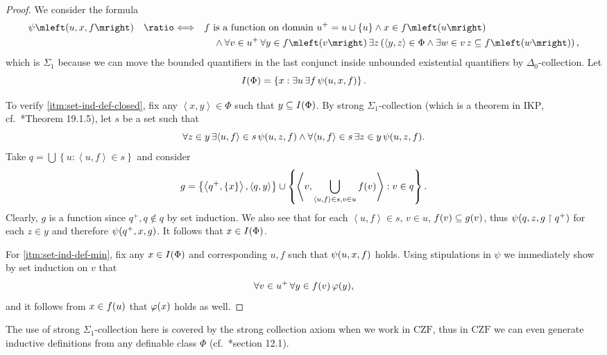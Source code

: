 \documentclass[12pt,openany]{book}
\theoremstyle{plain}
\theoremstyle{definition}
\newcommand\tuple[1]{\left\langle #1 \right\rangle}
\newcommand\opA[1]{\mathop{\forall #1}}
\newcommand\opE[1]{\mathop{\exists #1}}
\newcommand\defeqv{\quad \ratio\Longleftrightarrow \quad}
\newcommand\CZF{\mathrm{CZF}}
\newcommand\IKP{\mathrm{IKP}}
\begin{document}
\begin{proof}
  We consider the formula
  \begin{align*}
    \psi\mleft(u, x, f\mright) \defeqv & \text{$f$ is a function on domain $u^+ = u \cup \left\{u\right\}$} \land x \in f\mleft(u\mright)                                                           \\
                                       & \quad {} \land \opA{v \in u^+} \opA{y \in f\mleft(v\mright)} \opE{z} \left(\tuple{y, z} \in \Phi \land \opE{w \in v} z \subseteq f\mleft(w\mright)\right),
  \end{align*}
  which is $\Sigma_1$ because we can move the bounded quantifiers in the last conjunct inside unbounded existential quantifiers by $\Delta_0$-collection. Let
  \[I\mleft(\Phi\mright) = \left\{x : \opE{u} \opE{f} \psi\mleft(u, x, f\mright)\right\}.\]

  To verify \ref{itm:set-ind-def-closed}, fix any $\tuple{x, y} \in \Phi$ such that $y \subseteq I\mleft(\Phi\mright)$. By strong $\Sigma_1$-collection (which is a theorem in $\IKP$, cf.\ \cite{aczel-rathjen10-cst-book}*{Theorem 19.1.5}), let $s$ be a set such that
  \[\opA{z \in y} \opE{{\tuple{u, f} \in s}} \psi\mleft(u, z, f\mright) \land \opA{{\tuple{u, f} \in s}} \opE{z \in y} \psi\mleft(u, z, f\mright).\]
  Take $q = \bigcup \left\{u : \tuple{u, f} \in s\right\}$ and consider
  \[g = \left\{\tuple{q^+, \left\{x\right\}}, \tuple{q, y}\right\} \cup \left\{\tuple{v, \bigcup_{\tuple{u, f} \in s, v \in u} f\mleft(v\mright)} : v \in q\right\}.\]
  Clearly, $g$ is a function since $q^+, q \not\in q$ by set induction. We also see that for each $\tuple{u, f} \in s$, $v \in u$, $f\mleft(v\mright) \subseteq g\mleft(v\mright)$, thus $\psi\mleft(q, z, g \upharpoonright q^+\mright)$ for each $z \in y$ and therefore $\psi\mleft(q^+, x, g\mright)$. It follows that $x \in I\mleft(\Phi\mright)$.

  For \ref{itm:set-ind-def-min}, fix any $x \in I\mleft(\Phi\mright)$ and corresponding $u, f$ such that $\psi\mleft(u, x, f\mright)$ holds. Using stipulations in $\psi$ we immediately show by set induction on $v$ that
  \[\opA{v \in u^+} \opA{y \in f\mleft(v\mright)} \varphi\mleft(y\mright),\]
  and it follows from $x \in f\mleft(u\mright)$ that $\varphi\mleft(x\mright)$ holds as well.
\end{proof}

The use of strong $\Sigma_1$-collection here is covered by the strong collection axiom when we work in $\CZF$, thus in $\CZF$ we can even generate inductive definitions from any definable class $\Phi$ (cf.\ \cite{aczel-rathjen10-cst-book}*{section 12.1}).
\end{document}
